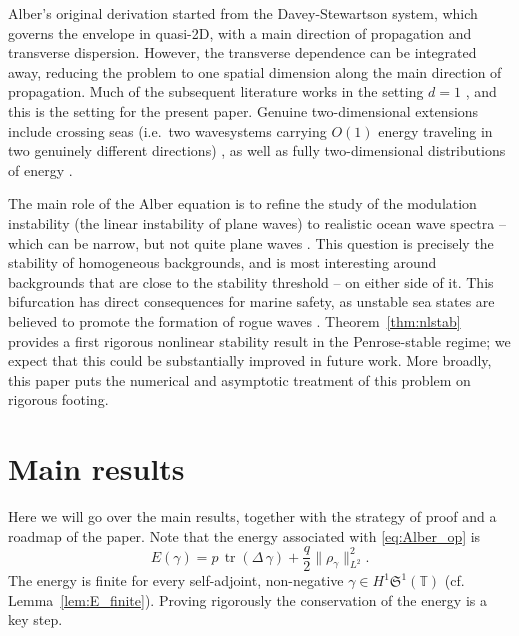 \documentclass[11pt]{amsart}
\theoremstyle{definition}
\newcommand{\T}{\mathbb{T}}
\newcommand{\Sp}{\mathfrak{S}}
\DeclareMathOperator{\tr}{tr}
\begin{document}
Alber's original derivation \cite{Alber1978} started from the Davey-Stewartson system, which governs the envelope in quasi-2D, with a main direction of propagation and   transverse dispersion. However, the transverse dependence can be integrated away, reducing the problem to one spatial dimension along the main direction of propagation. Much of the subsequent literature works in the setting $d=1$ \cite{AAPS2020,RibalBabaninYoungToffoliStiassnie2013,StiassnieRegevAgnon2008},  and this is the setting for the present paper. Genuine two-dimensional extensions  include crossing seas (i.e.\ two wavesystems carrying $O(1)$ energy traveling in two genuinely different directions) \cite{AthanassoulisGramstad2021}, as well as fully two-dimensional distributions of energy \cite{AndradeStiassnie2020,CrawfordSaffmanYuen1980}.


The main role of the  Alber equation is to refine the study of the modulation instability  (the linear instability of plane waves) \cite{MeiStiassnieYue2005b,MI,ZakharovOstrovsky2009} to realistic ocean wave spectra -- which can be narrow, but not quite plane waves \cite{Ochi} . This question is precisely the stability of homogeneous backgrounds, and is most interesting around backgrounds that are close to the stability threshold -- on either side of it.
This bifurcation has direct consequences for marine safety, as unstable sea states are believed to promote the formation of rogue waves \cite{AthanassoulisKarakatsaniKyza2025,Dysthe2008,RibalBabaninYoungToffoliStiassnie2013,StiassnieRegevAgnon2008}. Theorem~\ref{thm:nlstab} provides a first rigorous nonlinear stability result in the Penrose-stable regime; we expect that this could be substantially improved in future work. More broadly, this paper puts the numerical and asymptotic treatment of this problem on rigorous footing.



\section{Main results}\label{sec:mainresults}

Here we will go over the main results, together with the strategy of proof and a roadmap of the paper.
Note that  the energy associated with \eqref{eq:Alber_op} is
\begin{equation}\label{eq:E_def}
  E(\gamma) = p\,\tr(\Delta\,\gamma) + \frac{q}{2}\|\rho_\gamma\|_{L^2}^2.
\end{equation}
The energy is finite for every self-adjoint, non-negative $\gamma\in H^1\Sp^1(\T)$ (cf. Lemma~\ref{lem:E_finite}). %
Proving rigorously the conservation of the energy is a key step.
\end{document}
